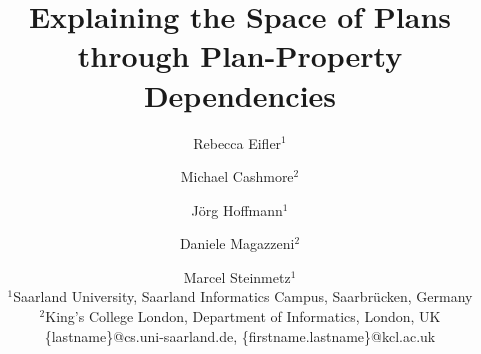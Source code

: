 \documentclass{article}
\begin{document}
\title{Explaining the Space of Plans through Plan-Property Dependencies}


\author{
	Rebecca Eifler$^1$\and
	Michael Cashmore$^2$\and
	J\"org Hoffmann$^1$\and
	Daniele Magazzeni$^2$\and
	Marcel Steinmetz$^1$\\
	$^1$Saarland University, Saarland Informatics Campus, Saarbr\"ucken, Germany\\
	$^2$King's College London, Department of Informatics, London, UK\\
	\{lastname\}@cs.uni-saarland.de,
	\{firstname.lastname\}@kcl.ac.uk 
}

\maketitle
\end{document}
